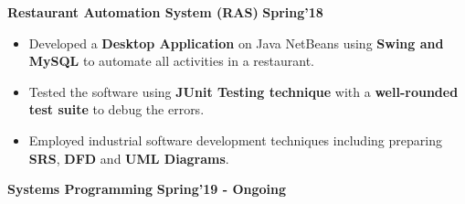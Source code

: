 \documentclass[10pt]{article}
\begin{document}
\vspace{-0.5ex}
\large {\textbf{Restaurant Automation System (RAS)}} \normalsize \href{https://github.com/shmundhra/Restaurant-Automation-System} {\hspace{0.5ex}\faGithub} {\hfill} \textbf{Spring'18}\\[-1.75em]
\begin{itemize}
    \item Developed a \textbf{Desktop Application} on Java NetBeans using \textbf{Swing and MySQL} to automate all activities in a restaurant.\\[-1.9em]
    \item Tested the software using \textbf{JUnit Testing technique} with a \textbf{well-rounded test suite} to debug the errors.  \\[-1.9em] \item Employed industrial software development techniques including preparing \textbf{SRS}, \textbf{DFD} and \textbf{UML Diagrams}. 
    \\[-1em]
\end{itemize}
\vspace{-0.5ex}
\large {\textbf{Systems Programming}} \normalsize \href{https://github.com/shmundhra/Systems-Programming}{\faGithub} {\hfill}\textbf{Spring'19 - Ongoing}\\[-1.8em]
\end{document}
